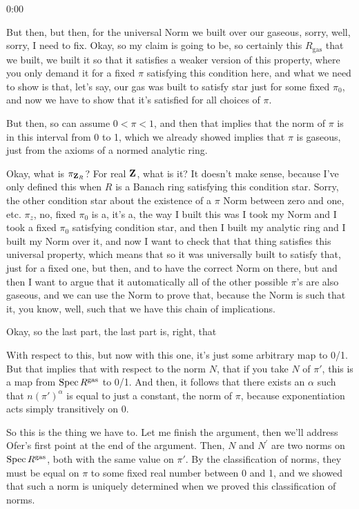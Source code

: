 \begin{unfinished}{0:00}
{But then, but then, for the universal Norm we built over our gaseous, sorry, well, sorry, I need to fix. Okay, so my claim is going to be, so certainly this $R_\mathrm{gas}$ that we built, we built it so that it satisfies a weaker version of this property, where you only demand it for a fixed $\pi$ satisfying this condition here, and what we need to show is that, let's say, our gas was built to satisfy star just for some fixed $\pi_0$, and now we have to show that it's satisfied for all choices of $\pi$.

But then, so can assume $0 < \pi < 1$, and then that implies that the norm of $\pi$ is in this interval from 0 to 1, which we already showed implies that $\pi$ is gaseous, just from the axioms of a normed analytic ring.

Okay, what is $\pi_{\mathbf Z_R}$? For real $\mathbf Z$, what is it? It doesn't make sense, because I've only defined this when $R$ is a Banach ring satisfying this condition star. Sorry, the other condition star about the existence of a $\pi$ Norm between zero and one, etc. $\pi_z$, no, fixed $\pi_0$ is a, it's a, the way I built this was I took my Norm and I took a fixed $\pi_0$ satisfying condition star, and then I built my analytic ring and I built my Norm over it, and now I want to check that that thing satisfies this universal property, which means that so it was universally built to satisfy that, just for a fixed one, but then, and to have the correct Norm on there, but and then I want to argue that it automatically all of the other possible $\pi$'s are also gaseous, and we can use the Norm to prove that, because the Norm is such that it, you know, well, such that we have this chain of implications.

Okay, so the last part, the last part is, right, that

With respect to this, but now with this one, it's just some arbitrary map to 0/1. But that implies that with respect to the norm $N$, that if you take $N$ of $\pi'$, this is a map from $\operatorname{Spec} R^{\mathrm{gas}}$ to 0/1. And then, it follows that there exists an $\alpha$ such that $n(\pi')^{\alpha}$ is equal to just a constant, the norm of $\pi$, because exponentiation acts simply transitively on 0.

So this is the thing we have to. Let me finish the argument, then we'll address Ofer's first point at the end of the argument. Then, $N$ and $N^{'}$ are two norms on $\operatorname{Spec} R^{\mathrm{gas}}$, both with the same value on $\pi'$. By the classification of norms, they must be equal on $\pi$ to some fixed real number between 0 and 1, and we showed that such a norm is uniquely determined when we proved this classification of norms.

}
\end{unfinished}
